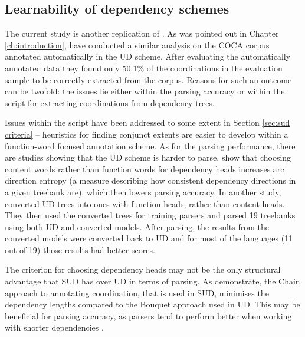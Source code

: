 \subsection{Learnability of dependency schemes}\label{sec:learnability}
The current study is another replication of \cite{prz:woz:23}. As was pointed out in Chapter \ref{ch:introduction}, \cite{prz:etal:24} have conducted a similar analysis on the COCA corpus annotated automatically in the UD scheme. After evaluating the automatically annotated data they found only 50.1\% of the coordinations in the evaluation sample to be correctly extracted from the corpus. Reasons for such an outcome can be twofold: the issues lie either within the parsing accuracy or within the script for extracting coordinations from dependency trees. 

Issues within the script have been addressed to some extent in Section \ref{sec:sud criteria} -- heuristics for finding conjunct extents are easier to develop within a function-word focused annotation scheme. As for the parsing performance, there are studies showing that the UD scheme is harder to parse. \cite{rehbein-etal-2017-universal} show that choosing content words rather than function words for dependency heads increases arc direction entropy (a measure describing how consistent dependency directions in a given treebank are), which then lowers parsing accuracy. In another study, \cite{kohita-etal-2017-multilingual} converted UD trees into ones with function heads, rather than content heads. They then used the converted trees for training parsers and parsed 19 treebanks using both UD and converted models. After parsing, the results from the converted models were converted back to UD and for most of the languages (11 out of 19) those results had better scores. 

The criterion for choosing dependency heads may not be the only structural advantage that SUD has over UD in terms of parsing. As \cite{gerdes-etal-2018-sud} demonstrate, the Chain approach to annotating coordination, that is used in SUD, minimises the dependency lengths compared to the Bouquet approach used in UD. This may be beneficial for parsing accuracy, as parsers tend to perform better when working with shorter dependencies \citep{nilsson-etal-2006-graph, eisner-smith-2005-parsing}. 

